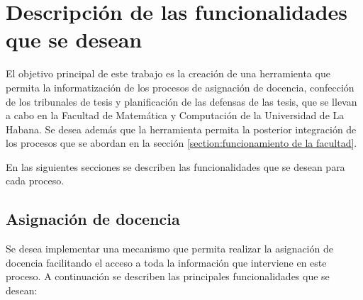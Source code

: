 \chapter{Descripción de las funcionalidades que se desean}\label{chapter:features}

El objetivo principal de este trabajo es la creación de
una herramienta que permita la informatización de los procesos de
asignación de docencia, confección de los tribunales de tesis y planificación de las defensas
de las tesis, que se llevan a cabo en la Facultad de Matemática y Computación
de la Universidad de La Habana.
Se desea además que la herramienta permita la 
posterior integración de los procesos que se abordan en la 
sección \ref{section:funcionamiento de la facultad}.


En las siguientes secciones se describen las funcionalidades
que se desean para cada proceso.















\section{Asignación de docencia}
Se desea implementar una mecanismo que permita realizar la asignación de docencia 
facilitando el acceso a toda la información que interviene en este proceso. A continuación 
se describen las principales funcionalidades que se desean:


